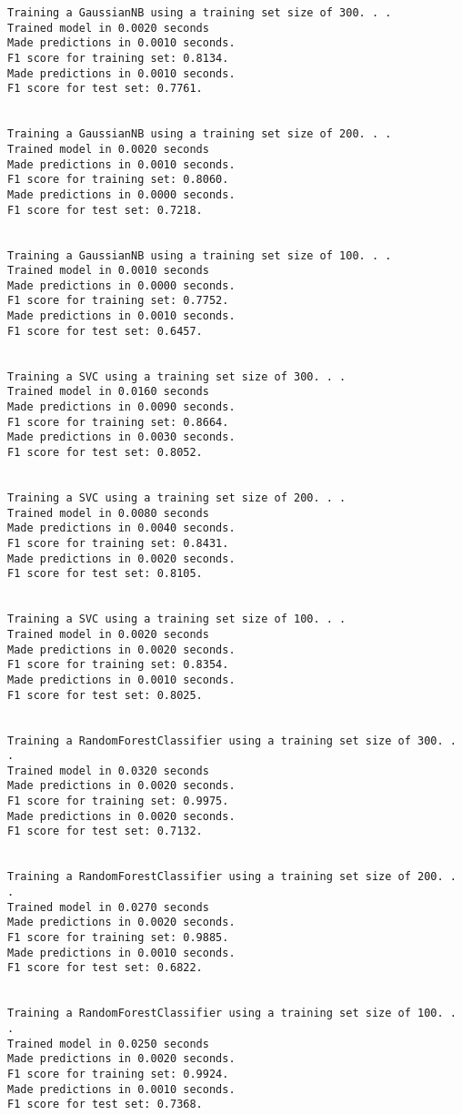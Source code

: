 \documentclass[11pt]{article}
\begin{document}
    \begin{Verbatim}[commandchars=\\\{\}]
Training a GaussianNB using a training set size of 300. . .
Trained model in 0.0020 seconds
Made predictions in 0.0010 seconds.
F1 score for training set: 0.8134.
Made predictions in 0.0010 seconds.
F1 score for test set: 0.7761.


Training a GaussianNB using a training set size of 200. . .
Trained model in 0.0020 seconds
Made predictions in 0.0010 seconds.
F1 score for training set: 0.8060.
Made predictions in 0.0000 seconds.
F1 score for test set: 0.7218.


Training a GaussianNB using a training set size of 100. . .
Trained model in 0.0010 seconds
Made predictions in 0.0000 seconds.
F1 score for training set: 0.7752.
Made predictions in 0.0010 seconds.
F1 score for test set: 0.6457.


Training a SVC using a training set size of 300. . .
Trained model in 0.0160 seconds
Made predictions in 0.0090 seconds.
F1 score for training set: 0.8664.
Made predictions in 0.0030 seconds.
F1 score for test set: 0.8052.


Training a SVC using a training set size of 200. . .
Trained model in 0.0080 seconds
Made predictions in 0.0040 seconds.
F1 score for training set: 0.8431.
Made predictions in 0.0020 seconds.
F1 score for test set: 0.8105.


Training a SVC using a training set size of 100. . .
Trained model in 0.0020 seconds
Made predictions in 0.0020 seconds.
F1 score for training set: 0.8354.
Made predictions in 0.0010 seconds.
F1 score for test set: 0.8025.


Training a RandomForestClassifier using a training set size of 300. . .
Trained model in 0.0320 seconds
Made predictions in 0.0020 seconds.
F1 score for training set: 0.9975.
Made predictions in 0.0020 seconds.
F1 score for test set: 0.7132.


Training a RandomForestClassifier using a training set size of 200. . .
Trained model in 0.0270 seconds
Made predictions in 0.0020 seconds.
F1 score for training set: 0.9885.
Made predictions in 0.0010 seconds.
F1 score for test set: 0.6822.


Training a RandomForestClassifier using a training set size of 100. . .
Trained model in 0.0250 seconds
Made predictions in 0.0020 seconds.
F1 score for training set: 0.9924.
Made predictions in 0.0010 seconds.
F1 score for test set: 0.7368.



    \end{Verbatim}
\end{document}
